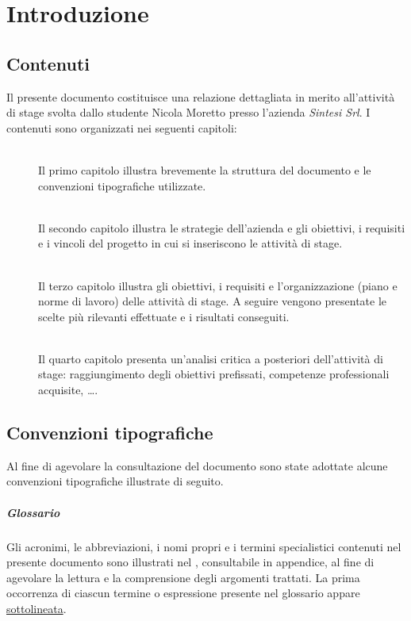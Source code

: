 \chapter{Introduzione}
\label{ch:tesi:intro}

\section{Contenuti}
Il presente documento costituisce una relazione dettagliata in merito all'attività di stage svolta dallo studente Nicola Moretto presso l'azienda \textit{Sintesi Srl}. I contenuti sono organizzati nei seguenti capitoli:
\begin{description}
  \item[] \hfill \\
  Il primo capitolo illustra brevemente la struttura del documento e le convenzioni tipografiche utilizzate.
  \item[] \hfill \\
  Il secondo capitolo illustra le strategie dell'azienda e gli obiettivi, i requisiti e i vincoli del progetto in cui si inseriscono le attività di stage.
  \item[] \hfill \\ 
	Il terzo capitolo illustra gli obiettivi, i requisiti e l'organizzazione (piano e norme di lavoro) delle attività di stage. A seguire vengono presentate le scelte più rilevanti effettuate e i risultati conseguiti.
  \item[] \hfill \\
	Il quarto capitolo presenta un'analisi critica a posteriori dell'attività di stage: raggiungimento degli obiettivi prefissati, competenze professionali acquisite, \ldots.
\end{description}

\section{Convenzioni tipografiche}
Al fine di agevolare la consultazione del documento sono state adottate alcune convenzioni tipografiche illustrate di seguito.

\paragraph{Glossario} Gli acronimi, le abbreviazioni, i nomi propri e i termini specialistici contenuti nel presente documento sono illustrati nel \textit{}, consultabile in appendice, al fine di agevolare la lettura e la comprensione degli argomenti trattati. La prima occorrenza di ciascun termine o espressione presente nel glossario appare \underline{sottolineata}.

